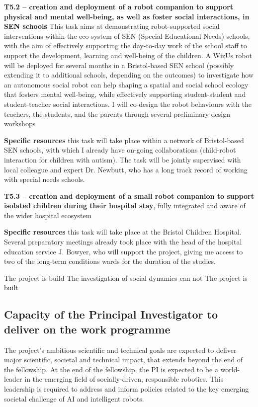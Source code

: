 \documentclass[11pt]{report}
\newcommand{\project}{WizUs\xspace}
\begin{document}
\textbf{T5.2 -- creation and deployment of a robot companion to
support physical and mental well-being, as well as foster social interactions,
in SEN schools} This task aims at demonstrating robot-supported social
interventions within the eco-system of SEN (Special Educational Needs)
schools, with the aim of effectively supporting the day-to-day work of the
school staff to support the development, learning and well-being of the
children. A \project robot will be deployed for several months in a
Bristol-based SEN school (possibly extending it to additional schools, depending
on the outcomes) to investigate how an autonomous social robot can help shaping
a spatial and social school ecology that fosters mental well-being, while
effectively supporting student-student and student-teacher social interactions.
I will co-design the robot behaviours with the teachers, the students, and the
parents through several preliminary design workshops

\textbf{Specific resources} this task will take place within a network of
Bristol-based SEN schools, with which I already have on-going collaborations
(child-robot interaction for children with autism). The task will be
jointly supervised with local colleague and expert Dr. Newbutt, who has a long
track record of working with special needs schools.


\textbf{T5.3 -- creation and deployment of a small robot companion to support
isolated children during their hospital stay}, fully integrated and aware of the
wider hospital ecosystem


\textbf{Specific resources} this task will take place at the Bristol Children
Hospital. Several preparatory meetings already took place with the head of the
hospital education service J. Bowyer, who will support the project, giving me
access to two of the long-term conditions wards for the duration of the studies.



The project is build 
The investigation of social dynamics can not
The project is built 





\subsection{Capacity of the Principal Investigator to deliver on the work programme}

The project's ambitious scientific and technical goals are expected to deliver
major scientific, societal and technical impact, that extends beyond the
end of the fellowship. At the end of the fellowship, the PI is expected to be a
world-leader in the emerging field of socially-driven, responsible robotics.
This leadership is required to address and inform policies related to the key
emerging societal challenge of AI and intelligent robots.
\end{document}

